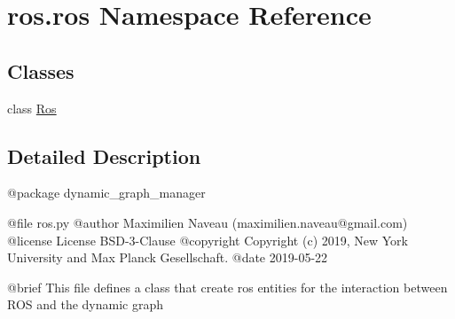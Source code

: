 \hypertarget{namespaceros_1_1ros}{}\section{ros.\+ros Namespace Reference}
\label{namespaceros_1_1ros}
\subsection*{Classes}
\begin{DoxyCompactItemize}
\item 
class \hyperlink{classros_1_1ros_1_1Ros}{Ros}
\end{DoxyCompactItemize}


\subsection{Detailed Description}
\begin{DoxyVerb}@package dynamic_graph_manager

@file ros.py
@author Maximilien Naveau (maximilien.naveau@gmail.com)
@license License BSD-3-Clause
@copyright Copyright (c) 2019, New York University and Max Planck Gesellschaft.
@date 2019-05-22

@brief This file defines a class that create ros entities for the interaction
between ROS and the dynamic graph\end{DoxyVerb}
 